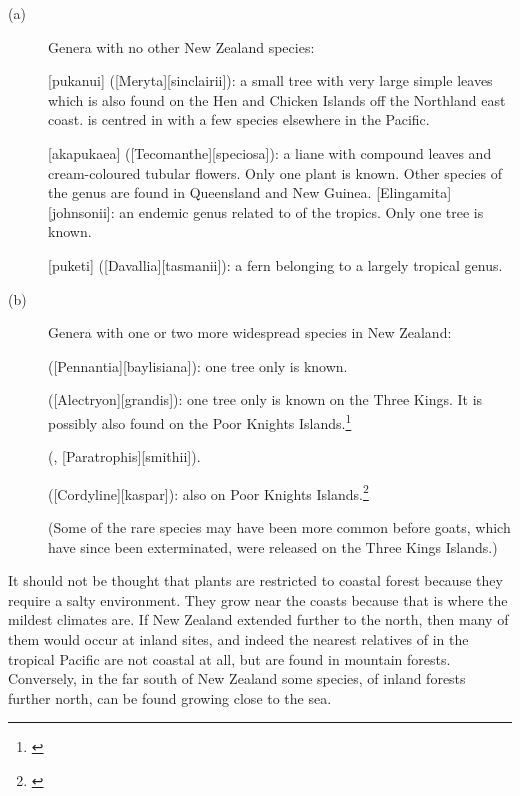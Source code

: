 \begin{description}
	\item[{(a)}]Genera with no other New Zealand species:

	[pukanui] ([Meryta][sinclairii]): a small tree with very large simple leaves which is also found on the Hen and Chicken Islands off the Northland east coast.  is centred in  with a few species elsewhere in the Pacific.

	[akapukaea] ([Tecomanthe][speciosa]): a liane with compound leaves and cream-coloured tubular flowers.
	Only one plant is known.
	Other species of the genus are found in Queensland and New Guinea. [Elingamita][johnsonii]: an endemic genus related to  of the tropics.
	Only one tree is known.

	[puketi] ([Davallia][tasmanii]): a fern belonging to a largely tropical genus.
	
	\item[{(b)}]Genera with one or two more widespread species in New Zealand:

	 ([Pennantia][baylisiana]): one tree only is known.

	 ([Alectryon][grandis]): one tree only is known on the Three Kings.
	It is possibly also found on the Poor Knights Islands.\footnote{\cite{wright1983conservation}}

	 (, [Paratrophis][smithii]).

	 ([Cordyline][kaspar]): also on Poor Knights Islands.\footnote{\cite{wright1983conservation}}

	(Some of the rare species may have been more common before goats, which have since been exterminated, were released on the Three Kings Islands.)
\end{description}

It should not be thought that plants are restricted to coastal forest because they require a salty environment.
They grow near the coasts because that is where the mildest climates are.
If New Zealand extended further to the north, then many of them would occur at inland sites, and indeed the nearest relatives of  in the tropical Pacific are not coastal at all, but are found in mountain forests.
Conversely, in the far south of New Zealand some species, of inland forests further north, can be found growing close to the sea.


